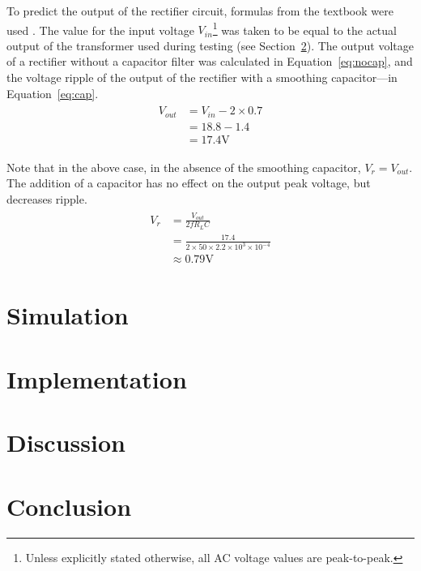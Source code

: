 \documentclass[12pt]{article}
\begin{document}
To predict the output of the rectifier circuit, formulas from the textbook were used \citep{textbook}. The value for the input voltage $V_{in}$\footnote{Unless explicitly stated otherwise, all AC voltage values are peak-to-peak.} was taken to be equal to the actual output of the transformer used during testing (see Section~\ref{sec:imp}). The output voltage of a rectifier without a capacitor filter was calculated in Equation~\ref{eq:nocap}, and the voltage ripple of the output of the rectifier with a smoothing capacitor---in Equation~\ref{eq:cap}.
\begin{align}
\begin{split}
V_{out}&=V_{in}-2\times0.7\\
&=18.8-1.4\\
&=17.4\mathrm{V}
\label{eq:nocap}
\end{split}
\end{align}

Note that in the above case, in the absence of the smoothing capacitor, $V_r=V_{out}$. The addition of a capacitor has no effect on the output peak voltage, but decreases ripple.
\begin{align}
\begin{split}
V_{r}&=\frac{V_{out}}{2f R_L C}\\
&=\frac{17.4}{2\times50\times2.2\times10^3\times10^{-4}}\\
&\approx0.79\mathrm{V}
\label{eq:cap}
\end{split}
\end{align}

\section{Simulation}
\label{sec:sim}
\section{Implementation}
\label{sec:imp}
\section{Discussion}
\label{sec:dis}
\section{Conclusion}
\label{sec:con}

\end{document}
